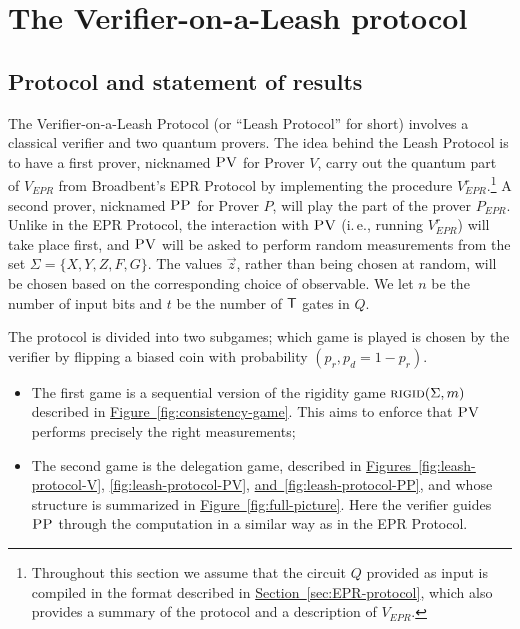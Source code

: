 \documentclass[11pt]{article}
\numberwithin{equation}{section}
\theoremstyle{definition}
\theoremstyle{plain}
\newcommand{\ie}{i.\,e.}
\newcommand{\expref}[2]{\hyperref[#2]{#1~\ref{#2}}}
\newcommand{\rigid}{\textsc{rigid}}
\newcommand{\pv}{\textsc{PV}}
\newcommand{\pp}{\textsc{PP}}
\begin{document}
 


\section{The Verifier-on-a-Leash protocol}   %
\label{sec:leash}





\subsection{Protocol and statement of results}
\label{sec:leash subsec}

The Verifier-on-a-Leash Protocol (or ``Leash Protocol'' for short) involves a classical verifier and two quantum provers.
The idea behind the Leash Protocol is to have a first prover, nicknamed $\pv$ for Prover $V$, carry out the quantum part of $V_{EPR}$ from Broadbent's EPR Protocol by implementing the procedure $V_{EPR}^r$.\footnote{Throughout this section we assume that the circuit $Q$ provided as input is compiled in the format described in \expref{Section}{sec:EPR-protocol}, which also provides a summary of the protocol and a description of $V_{EPR}$.} A second prover, nicknamed $\pp$ for Prover $P$, will play the part of the prover $P_{EPR}$. Unlike in the EPR Protocol, the interaction with $\pv$ (\ie, running $V_{EPR}^r$) will take place {first}, and $\pv$ will be asked to perform {random} measurements from the set $\Sigma = \{X,Y,Z,F,G\}$. The values $\vec{z}$, rather than being chosen at random, will be chosen based on the corresponding choice of observable. We let $n$ be the number of input bits and $t$ be the number of $\sf T$ gates in $Q$. 

The protocol is divided into two subgames; which game is played is chosen by the verifier by flipping a biased coin with probability $(p_r,p_d=1-p_r)$.
\begin{itemize}[nolistsep]
\item The first game is a sequential version of the rigidity game $\rigid(\Sigma,m)$ described in \expref{Figure}{fig:consistency-game}. This aims to enforce that $\pv$ performs precisely the right measurements;

\item The second game is the delegation game, described in \expref{Figures}{fig:leash-protocol-V}, \ref{fig:leash-protocol-PV}, \expref{and}{fig:leash-protocol-PP}, and whose structure is summarized in \expref{Figure}{fig:full-picture}. Here the verifier guides $\pp$ through the computation in a similar way as in the EPR Protocol.
\end{itemize}
\end{document}
